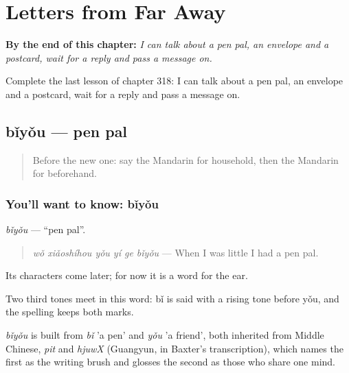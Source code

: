 
\chapter{Letters from Far Away}
\label{ch:zh-letters-from-far-away}

\begin{chapteropening}
\textbf{By the end of this chapter:} \emph{I can talk about a pen pal, an envelope and a postcard, wait for a reply and pass a message on.}

Complete the last lesson of chapter 318: I can talk about a pen pal, an envelope and a postcard, wait for a reply and pass a message on.
\end{chapteropening}

\section[bǐyǒu]{bǐyǒu — pen pal}

\label{lesson:ZH-C318-biyou}



\begin{quote}
Before the new one: say the Mandarin for household, then the Mandarin for beforehand.
\end{quote}

\subsection*{You'll want to know: bǐyǒu}
\emph{bǐyǒu} — \textquotedblleft{}pen pal\textquotedblright{}.

\begin{quote}
\emph{wǒ xiǎoshíhou yǒu yí ge bǐyǒu} — When I was little I had a pen pal.
\end{quote}

Its characters come later; for now it is a word for the ear.

Two third tones meet in this word: bǐ is said with a rising tone before yǒu, and the spelling keeps both marks.

\begin{cousinweb}
\emph{bǐyǒu} is built from \emph{bǐ} 'a pen' and \emph{yǒu} 'a friend', both inherited from Middle Chinese, \emph{pit} and \emph{hjuwX} (Guangyun, in Baxter's transcription), which names the first as the writing brush and glosses the second as those who share one mind.
\end{cousinweb}

